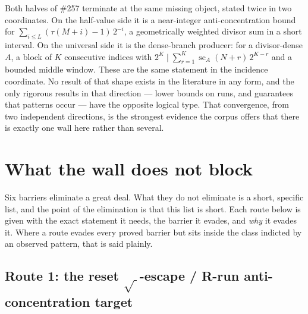 \documentclass[11pt]{article}
\theoremstyle{plain}
\theoremstyle{definition}
\theoremstyle{remark}
\begin{document}
Both halves of \#257 terminate at the same missing object, stated twice in two coordinates. On the
half-value side it is a near-integer anti-concentration bound for
$\sum_{i \le L} (\tau(M+i) - 1)\,2^{-i}$, a geometrically weighted divisor sum in a short interval.
On the universal side it is the dense-branch producer: for a divisor-dense $A$, a block of $K$
consecutive indices with $2^K \mid \sum_{r=1}^{K} \operatorname{sc}_A(N+r)\,2^{K-r}$ and a bounded
middle window. These are the same statement in the incidence coordinate. No result of that shape
exists in the literature in any form, and the only rigorous results in that direction --- lower
bounds on runs, and guarantees that patterns occur --- have the opposite logical type. That
convergence, from two independent directions, is the strongest evidence the corpus offers that
there is exactly one wall here rather than several.

\section{What the wall does not block}
\label{sec:257-survivors}

Six barriers eliminate a great deal. What they do not eliminate is a short, specific list, and the
point of the elimination is that this list is short. Each route below is given with the exact
statement it needs, the barrier it evades, and \emph{why} it evades it. Where a route evades every
proved barrier but sits inside the class indicted by an observed pattern, that is said plainly.

\subsection{Route 1: the reset \texorpdfstring{\(\sqrt{\ }\)}{square-root}-escape / R-run anti-concentration target}
\label{ssec:route-1}
\end{document}
